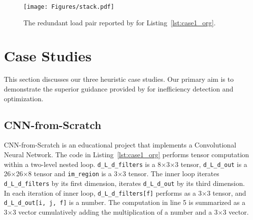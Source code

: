 \begin{figure}[t]
	\centering
	\texttt{[image: Figures/stack.pdf]}
	\caption{The redundant load pair reported by \tool for Listing~\ref{lst:case1_org}.}
	\label{fig:callpath1}
\end{figure}






\section{Case Studies}
\label{casestudy}

This section discusses our three heuristic case studies. Our primary aim is to demonstrate the superior guidance provided by \tool for inefficiency detection and optimization.

\subsection{CNN-from-Scratch}
CNN-from-Scratch is an educational project that implements a Convolutional Neural Network. The code in Listing~\ref{lst:case1_org} performs tensor computation within a two-level nested loop. {\tt d\_L\_d\_filters} is a 8$\times$3$\times$3 tensor, {\tt d\_L\_d\_out} is a 26$\times$26$\times$8 tensor and {\tt im\_region} is a 3$\times$3 tensor. The inner loop iterates {\tt d\_L\_d\_filters} by its first dimension, iterates {\tt d\_L\_d\_out} by its third dimension. In each iteration of inner loop, {\tt d\_L\_d\_filters[f]} performs as a 3$\times$3 tensor, and {\tt d\_L\_d\_out[i, j, f]} is a number. The computation in line 5 is summarized as a 3$\times$3 vector cumulatively adding the multiplication of a number and a 3$\times$3 vector.







